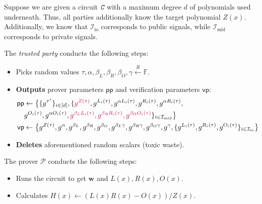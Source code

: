 \documentclass[../lecture-notes.tex]{subfiles}
\begin{document}
\begin{tcolorbox}[title=Attempt \#5: Turning SNARK into zk-SNARK,
    colback=blue!5!white,
    colframe=blue!75!black,
    colbacktitle=blue!25!white,
    coltitle=blue!20!black,
    fonttitle=\bfseries,
    boxrule=1.25pt,
    subtitle style={boxrule=0pt,
    colback=blue!20!white,
    colupper=blue!75!gray} ]
    \small
    Suppose we are given a circuit $\textit{\texttt{C}}$ with a maximum degree $d$ of polynomials used underneath. Thus, all parties additionally know the target polynomial $Z(x)$. Additionally, we know that $\mathcal{I}_{\text{io}}$ corresponds to public signals, while $\mathcal{I}_{\text{mid}}$ corresponds to private signals.

    The \emph{trusted party} conducts the following steps:
    \begin{itemize}[label=]
        \item Picks random values $\tau, \alpha, \beta_L, \beta_R, \beta_O, \gamma \xleftarrow{R} \mathbb{F}$.
        \item \textbf{Outputs} prover parameters $\mathsf{pp}$ and verification parameters $\mathsf{vp}$:
        \begin{align*}
            \mathsf{pp} &\gets \big\{\{g^{\tau^i}\}_{i \in [d]}, \{\textcolor{purple}{g^{Z(\tau)}}, g^{L_i(\tau)}, g^{\alpha L_i(\tau)}, g^{R_i(\tau)}, g^{\alpha R_i(\tau)}, \\ 
            & g^{O_i(\tau)}, g^{\alpha O_i(\tau)}, \textcolor{purple}{g^{\beta_LL_i(\tau)}, g^{\beta_RR_i(\tau)}, g^{\beta_OO_i(\tau)}}\}_{i \in \mathcal{I}_{\text{mid}}}\big\} \\
            \mathsf{vp} &\gets \big\{ g^{Z(\tau)}, g^{\alpha}, g^{\beta_L}, g^{\beta_R}, g^{\beta_O}, g^{\beta_L\gamma}, g^{\beta_R\gamma}, g^{\beta_O\gamma}, g^{\gamma}, \{g^{L_i(\tau)}, g^{R_i(\tau)}, g^{O_i(\tau)}\}_{i \in \mathcal{I}_{\text{io}}} \big\}
        \end{align*}
        \item \textbf{Deletes} aforementioned random scalars (toxic waste).
    \end{itemize}
    The prover $\mathcal{P}$ conducts the following steps:
    \begin{itemize}[label=]
        \item Runs the circuit to get $\mathbf{w}$ and $L(x),R(x),O(x)$.
        \item Calculates $H(x) \gets (L(x)R(x) - O(x))\big/ Z(x)$.

\end{itemize}
\end{tcolorbox}
\end{document}
